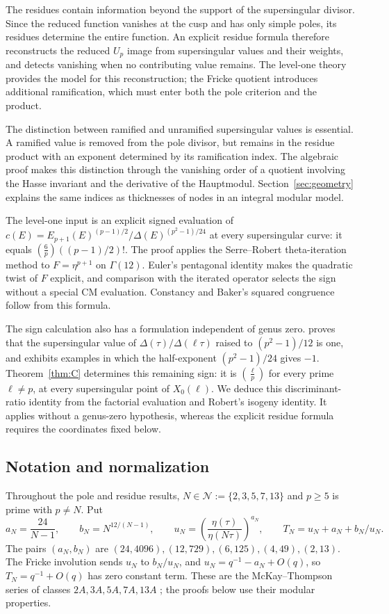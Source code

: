 \documentclass[11pt,a4paper]{article}
\numberwithin{equation}{section}
\theoremstyle{definition}
\theoremstyle{remark}
\begin{document}
The residues contain information beyond the support of the supersingular divisor.
Since the reduced function vanishes at the cusp and has only simple poles, its
residues determine the entire function. An explicit residue formula therefore
reconstructs the reduced $U_p$ image from supersingular values and their weights,
and detects vanishing when no contributing value remains. The level-one theory
provides the model for this reconstruction; the Fricke quotient introduces
additional ramification, which must enter both the pole criterion and the product.

The distinction between ramified and unramified supersingular values is essential.
A ramified value is removed from the pole divisor, but remains in the residue
product with an exponent determined by its ramification index. The algebraic proof
makes this distinction through the vanishing order of a quotient involving the Hasse
invariant and the derivative of the Hauptmodul. Section~\ref{sec:geometry} explains
the same indices as thicknesses of nodes in an integral modular model.

The level-one input is an explicit signed evaluation of
$c(E)=E_{p+1}(E)^{(p-1)/2}/\Delta(E)^{(p^2-1)/24}$ at every supersingular
curve: it equals $\left(\frac6p\right)((p-1)/2)!$. The proof applies the
Serre--Robert theta-iteration method to $F=\eta^{p+1}$ on $\Gamma(12)$.
Euler's pentagonal identity makes the quadratic twist of $F$ explicit,
and comparison with the iterated operator selects the sign without a
special CM evaluation. Constancy and Baker's squared congruence follow
from this formula.

The sign calculation also has a formulation independent of genus zero.
\citet[Theorem~1.2 and Remark~4]{Ono25} proves that the supersingular value of
$\Delta(\tau)/\Delta(\ell\tau)$ raised to $(p^2-1)/12$ is one, and exhibits
examples in which the half-exponent $(p^2-1)/24$ gives $-1$.
Theorem~\ref{thm:C} determines this remaining sign: it is
$\left(\frac{\ell}{p}\right)$ for every prime $\ell\ne p$, at every
supersingular point of $X_0(\ell)$. We deduce this discriminant-ratio
identity from the factorial evaluation and Robert's isogeny identity.
It applies without a genus-zero hypothesis, whereas the explicit residue
formula requires the coordinates fixed below.

\subsection{Notation and normalization}
Throughout the pole and residue results,
$N\in\mathcal N:=\{2,3,5,7,13\}$ and $p\ge5$ is prime with $p\ne N$. Put
\[
a_N=\frac{24}{N-1},\qquad b_N=N^{12/(N-1)},\qquad
u_N=\left(\frac{\eta(\tau)}{\eta(N\tau)}\right)^{a_N},\qquad
T_N=u_N+a_N+b_N/u_N.
\]
The pairs $(a_N,b_N)$ are $(24,4096),(12,729),(6,125),(4,49),(2,13)$.
The Fricke involution sends $u_N$ to $b_N/u_N$, and
$u_N=q^{-1}-a_N+O(q)$, so $T_N=q^{-1}+O(q)$ has zero constant term.
These are the McKay--Thompson series of classes $2A,3A,5A,7A,13A$
\citep{CN79}; the proofs below use their modular properties.
\end{document}

